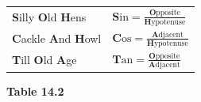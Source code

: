 {\begin{center}
\begin{xtabular*}{\mytablewidth}[t]{|p{10\mystarwidth}|p{10\mystarwidth}|}
        \textbf{S}illy \textbf{O}ld \textbf{H}ens &
                  \begin{math}\mathbf{S}\mathrm{in}=\frac{\mathbf{O}\mathrm{pposite}}{\mathbf{H}\mathrm{ypotenuse}}\end{math}
     \tabularnewline{}
        \textbf{C}ackle \textbf{A}nd \textbf{H}owl &
                  \begin{math}\mathbf{C}\mathrm{os}=\frac{\mathbf{A}\mathrm{djacent}}{\mathbf{H}\mathrm{ypotenuse}}\end{math}
     \tabularnewline{}
        \textbf{T}ill \textbf{O}ld \textbf{A}ge &
                  \begin{math}\mathbf{T}\mathrm{an}=\frac{\mathbf{O}\mathrm{pposite}}{\mathbf{A}\mathrm{djacent}}\end{math}
     \tabularnewline{}
    \end{xtabular*}
      \end{center}
    \begin{center}{\small\bfseries Table 14.2}\end{center}
        }%
